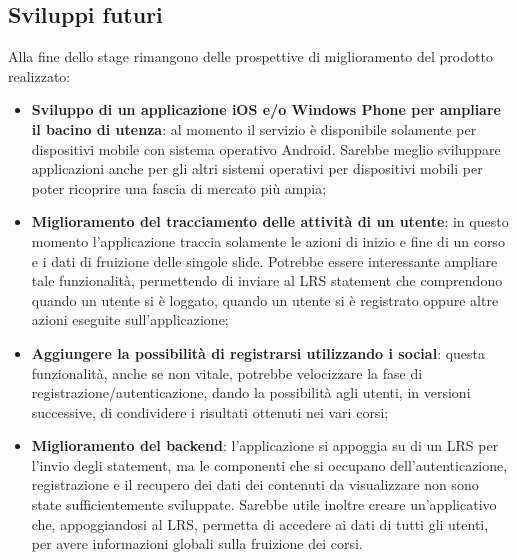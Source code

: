\documentclass[../Tesi.tex]{subfiles}
\begin{document}
	\subsection{Sviluppi futuri}
	Alla fine dello stage rimangono delle prospettive di miglioramento del prodotto realizzato:
	\begin{itemize}
		\item \textbf{Sviluppo di un applicazione iOS e/o Windows Phone per ampliare il bacino di utenza}: al momento il servizio è disponibile solamente per dispositivi mobile con sistema operativo Android. Sarebbe meglio sviluppare applicazioni anche per gli altri sistemi operativi per dispositivi mobili per poter ricoprire una fascia di mercato più ampia;
		\item \textbf{Miglioramento del tracciamento delle attività di un utente}: in questo momento l'applicazione traccia solamente le azioni di inizio e fine di un corso e i dati di fruizione delle singole slide. Potrebbe essere interessante ampliare tale funzionalità, permettendo di inviare al LRS statement che comprendono quando un utente si è loggato, quando un utente si è registrato oppure altre azioni eseguite sull'applicazione;
		\item \textbf{Aggiungere la possibilità di registrarsi utilizzando i social}: questa funzionalità, anche se non vitale, potrebbe velocizzare la fase di registrazione/autenticazione, dando la possibilità agli utenti, in versioni successive, di condividere i risultati ottenuti nei vari corsi;
		\item \textbf{Miglioramento del backend}: l'applicazione si appoggia su di un LRS per l'invio degli statement, ma le componenti che si occupano dell'autenticazione, registrazione e il recupero dei dati dei contenuti da visualizzare non sono state sufficientemente sviluppate. Sarebbe utile inoltre creare un'applicativo che, appoggiandosi al LRS, permetta di accedere ai dati di tutti gli utenti, per avere informazioni globali sulla fruizione dei corsi.
	\end{itemize}
\end{document}
